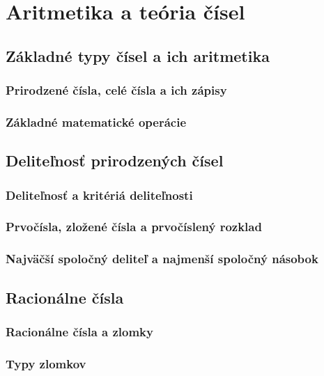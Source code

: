 \chapter{Aritmetika a teória čísel}
\label{chap:tc}

	
\section{Základné typy čísel a ich aritmetika}
	
\subsection{Prirodzené čísla, celé čísla a ich zápisy}
	
\subsection{Základné matematické operácie}
	
\section{Deliteľnosť prirodzených čísel}

\subsection{Deliteľnosť a kritériá deliteľnosti}
	
\subsection{Prvočísla, zložené čísla a prvočíslený rozklad}
	
\subsection{Najväčší spoločný deliteľ a najmenší spoločný násobok}

\newpage
	
\section{Racionálne čísla}
	
\subsection{Racionálne čísla a zlomky}
	
\subsection{Typy zlomkov}

